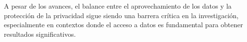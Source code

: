 A pesar de los avances, el balance entre el aprovechamiento de los datos y la protección de la privacidad sigue siendo una barrera crítica en la investigación, especialmente en contextos donde el acceso a datos es fundamental para obtener resultados significativos.






